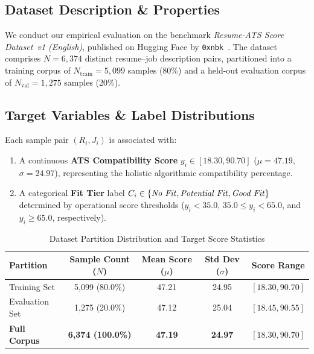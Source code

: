 \documentclass[conference]{IEEEtran}
\begin{document}
\subsection{Dataset Description \& Properties}
We conduct our empirical evaluation on the benchmark \textit{Resume-ATS Score Dataset~v1 (English)}, published on Hugging Face by \texttt{0xnbk}~\cite{dataset2024}. The dataset comprises $N = 6,374$ distinct resume--job description pairs, partitioned into a training corpus of $N_{\text{train}} = 5,099$ samples (80\%) and a held-out evaluation corpus of $N_{\text{val}} = 1,275$ samples (20\%).

\subsection{Target Variables \& Label Distributions}
Each sample pair $(R_i, J_i)$ is associated with:
\begin{enumerate}
    \item A continuous \textbf{ATS Compatibility Score} $y_i \in [18.30, 90.70]$ ($\mu = 47.19$, $\sigma = 24.97$), representing the holistic algorithmic compatibility percentage.
    \item A categorical \textbf{Fit Tier} label $C_i \in \{\text{\textit{No Fit}}, \text{\textit{Potential Fit}}, \text{\textit{Good Fit}}\}$ determined by operational score thresholds ($y_i < 35.0$, $35.0 \le y_i < 65.0$, and $y_i \ge 65.0$, respectively).
\end{enumerate}

\begin{table}[htbp]
\centering
\caption{Dataset Partition Distribution and Target Score Statistics}
\label{tab:dataset_stats}
\begin{tabular}{lcccc}
\toprule
\textbf{Partition} & \textbf{Sample Count ($N$)} & \textbf{Mean Score ($\mu$)} & \textbf{Std Dev ($\sigma$)} & \textbf{Score Range} \\
\midrule
Training Set       & 5,099 (80.0\%)              & 47.21                       & 24.95                       & $[18.30, 90.70]$ \\
Evaluation Set     & 1,275 (20.0\%)              & 47.12                       & 25.04                       & $[18.45, 90.55]$ \\
\textbf{Full Corpus} & \textbf{6,374 (100.0\%)}  & \textbf{47.19}              & \textbf{24.97}              & $\mathbf{[18.30, 90.70]}$ \\
\bottomrule
\end{tabular}
\end{table}
\end{document}
